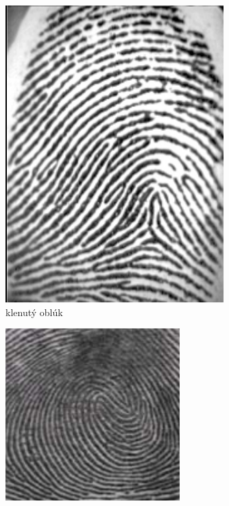 \begin{figure}[h]
\begin{subfigure}[b]{0.19\linewidth}
      \includegraphics[width=\linewidth]{obrazky-figures/klenuty_obluk.png}
      \caption{klenutý oblúk}
      \label{obr:triedy_odtlackov/klenuty_obluk}
    \end{subfigure}
    \hfill
    \begin{subfigure}[b]{0.19\linewidth}
      \includegraphics[width=\linewidth]{obrazky-figures/dvojita_slucka.png}

\end{subfigure}
\end{figure}
